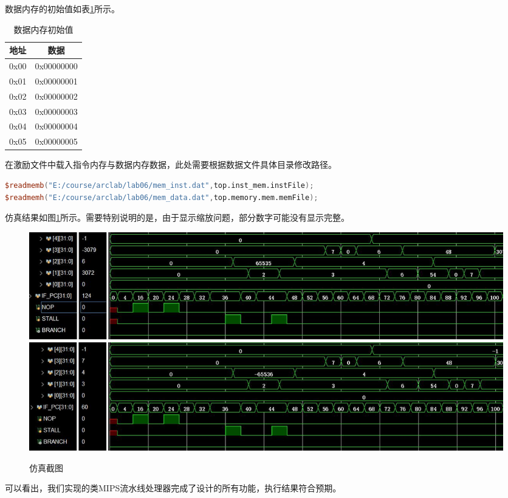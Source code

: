 \documentclass[UTF8]{ctexart}
\begin{document}
数据内存的初始值如表\ref{tab:sim-data}所示。\par
\begin{table}[htbp]
    \centering
    \begin{tabular}{|c|c|}
    \hline
    地址 & 数据 \\ \hline
    0x00 & 0x00000000 \\
    0x01 & 0x00000001 \\
    0x02 & 0x00000002 \\
    0x03 & 0x00000003 \\
    0x04 & 0x00000004 \\
    0x05 & 0x00000005 \\ \hline
    \end{tabular}
    \caption{数据内存初始值}
    \label{tab:sim-data}
    \end{table}
在激励文件中载入指令内存与数据内存数据，此处需要根据数据文件具体目录修改路径。\par
\begin{lstlisting}[language=verilog]
$readmemb("E:/course/arclab/lab06/mem_inst.dat",top.inst_mem.instFile);
$readmemh("E:/course/arclab/lab06/mem_data.dat",top.memory.mem.memFile);
\end{lstlisting}\par
仿真结果如图\ref{fig:sim-res}所示。需要特别说明的是，由于显示缩放问题，部分数字可能没有显示完整。
\begin{figure}[H]
    \centering
    \includegraphics[width=\textwidth]{fig-lab6-sim1.jpg}
    \includegraphics[width=\textwidth]{fig-lab6-sim2.jpg}
    \caption{仿真截图}
    \label{fig:sim-res}
\end{figure}\par
可以看出，我们实现的类MIPS流水线处理器完成了设计的所有功能，执行结果符合预期。
\end{document}
